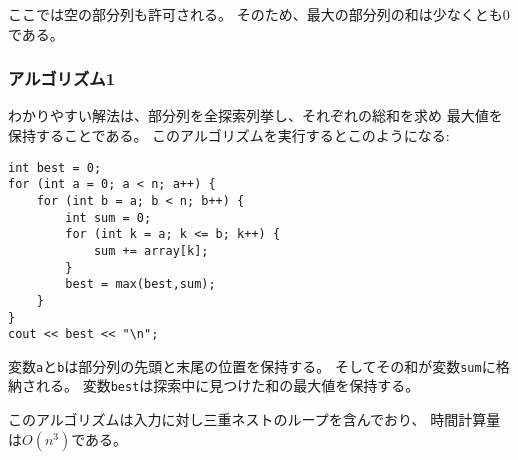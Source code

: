 \begin{comment}
We assume that an empty subarray is allowed,
so the maximum subarray sum is always at least $0$.
\end{comment}

ここでは空の部分列も許可される。
そのため、最大の部分列の和は少なくとも0である。

\begin{comment}
\subsubsection{Algorithm 1}

A straightforward way to solve the problem
is to go through all possible subarrays,
calculate the sum of values in each subarray and maintain
the maximum sum.
The following code implements this algorithm:
\end{comment}

\subsubsection{アルゴリズム1}

わかりやすい解法は、部分列を全探索列挙し、それぞれの総和を求め
最大値を保持することである。
このアルゴリズムを実行するとこのようになる:

\begin{lstlisting}
int best = 0;
for (int a = 0; a < n; a++) {
    for (int b = a; b < n; b++) {
        int sum = 0;
        for (int k = a; k <= b; k++) {
            sum += array[k];
        }
        best = max(best,sum);
    }
}
cout << best << "\n";
\end{lstlisting}

\begin{comment}
The variables \texttt{a} and \texttt{b} fix the first and
last index of the subarray,
and the sum of values is calculated to the variable \texttt{sum}.
The variable \texttt{best} contains the maximum sum found during the search.

The time complexity of the algorithm is $O(n^3)$,
because it consists of three nested loops 
that go through the input.
\end{comment}

変数\texttt{a}と\texttt{b}は部分列の先頭と末尾の位置を保持する。
そしてその和が変数\texttt{sum}に格納される。
変数\texttt{best}は探索中に見つけた和の最大値を保持する。

このアルゴリズムは入力に対し三重ネストのループを含んでおり、
時間計算量は$O(n^3)$である。


